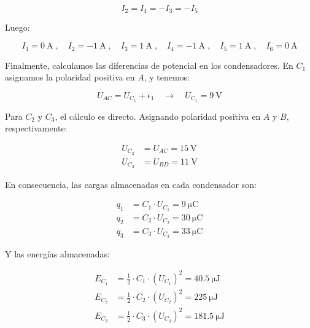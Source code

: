 \documentclass[10pt]{article}
\begin{document}
\vspace{-3mm}
\begin{equation*}
  I_2 = I_4 = -I_3 = -I_5
\end{equation*}

Luego:

\begin{equation*}
  \boxed{I_1 = \qty{0}{\ampere}} \; , \quad
  \boxed{I_2 = \qty{-1}{\ampere}} \; , \quad
  \boxed{I_3 = \qty{1}{\ampere}} \; , \quad
  \boxed{I_4 = \qty{-1}{\ampere}} \; , \quad
  \boxed{I_5 = \qty{1}{\ampere}} \; , \quad
  \boxed{I_6 = \qty{0}{\ampere}}
\end{equation*}

\vspace{4mm}
Finalmente, calculamos las diferencias de potencial en los
condensadores. En $C_1$ asignamos la polaridad positiva en $A$, y
tenemos:

\begin{equation*}
  U_{AC} = U_{C_1} + \epsilon_1 \quad \rightarrow \quad U_{C_1} = \qty{9}{\volt}
\end{equation*}

\vspace{4mm}
Para $C_2$ y $C_3$, el cálculo es directo. Asignando polaridad positiva en $A$ y $B$, respectivamente:

\vspace{-3mm}
\begin{align*}
  U_{C_2} &=  U_{AC} = \qty{15}{\volt}\\
  U_{C_3} &=  U_{BD} = \qty{11}{\volt}
\end{align*}

\vspace{2mm}
En consecuencia, las cargas almacenadas en cada condensador son:

\vspace{-4mm}
\begin{align*}
  q_1 &= C_1 \cdot U_{C_1} = \boxed{\qty{9}{\micro\coulomb}}\\
  q_2 &= C_2 \cdot U_{C_2} = \boxed{\qty{30}{\micro\coulomb}}\\
  q_3 &= C_3 \cdot U_{C_3} = \boxed{\qty{33}{\micro\coulomb}}
\end{align*}

\vspace{1mm}
Y las energías almacenadas:

\vspace{-4mm}
\begin{align*}
  E_{C_1} &= \frac{1}{2} \cdot C_1 \cdot (U_{C_1})^2 = \boxed{\qty{40.5}{\micro\joule}}\\
  E_{C_2} &= \frac{1}{2} \cdot C_2 \cdot (U_{C_2})^2 = \boxed{\qty{225}{\micro\joule}}\\
  E_{C_3} &= \frac{1}{2} \cdot C_3 \cdot (U_{C_3})^2 = \boxed{\qty{181.5}{\micro\joule}}
\end{align*}
\end{document}
